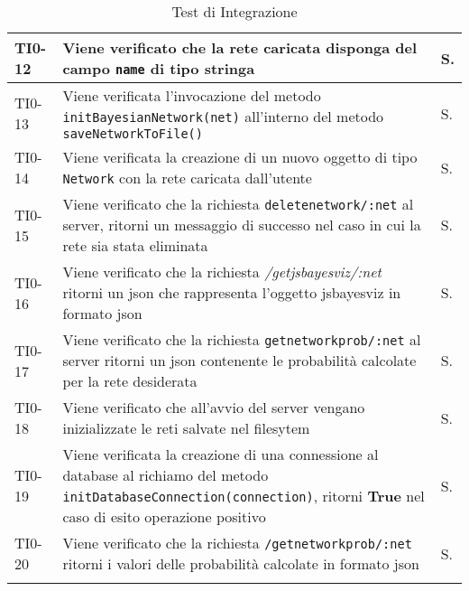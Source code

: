 \begin{longtable}{|C{.15\textwidth}|m{.66\textwidth}|m{.10\textwidth}|}
\hline
{}TI0-12 & Viene verificato che la rete caricata disponga del campo \texttt{name} di tipo \textbf{stringa} & S. \\ 
\hline
TI0-13 & Viene verificata l'invocazione del metodo \texttt{initBayesianNetwork(net)} all'interno del metodo \texttt{saveNetworkToFile()} & S. \\ 
\hline
{}TI0-14 & Viene verificata la creazione di un nuovo oggetto di tipo \texttt{Network} con la rete caricata dall'utente & S. \\ 
\hline
TI0-15 & Viene verificato che la richiesta \texttt{deletenetwork/:net} al server, ritorni un messaggio di successo nel caso in cui la rete sia stata eliminata & S. \\
\hline
{}TI0-16 & Viene verificato che la richiesta \textit{/getjsbayesviz/:net} ritorni un json che rappresenta l'oggetto jsbayesviz in formato json & S.\\
\hline
TI0-17 & Viene verificato che la richiesta \texttt{getnetworkprob/:net} al server ritorni un json contenente le probabilità calcolate per la rete desiderata & S. \\ 
\hline 
{}TI0-18 & Viene verificato che all'avvio del server vengano inizializzate le reti salvate nel filesytem & S. \\ 
\hline
TI0-19 &  Viene verificata la creazione di una connessione al database al richiamo del metodo \texttt{initDatabaseConnection(connection)}, ritorni \textbf{True} nel caso di esito operazione positivo & S.\\ 
\hline
{}TI0-20 & Viene verificato che la richiesta \texttt{/getnetworkprob/:net} ritorni i valori delle probabilità calcolate in formato json & S. \\ 
\hline

\caption{Test di Integrazione}
\label{testintegrazione}
\end{longtable}